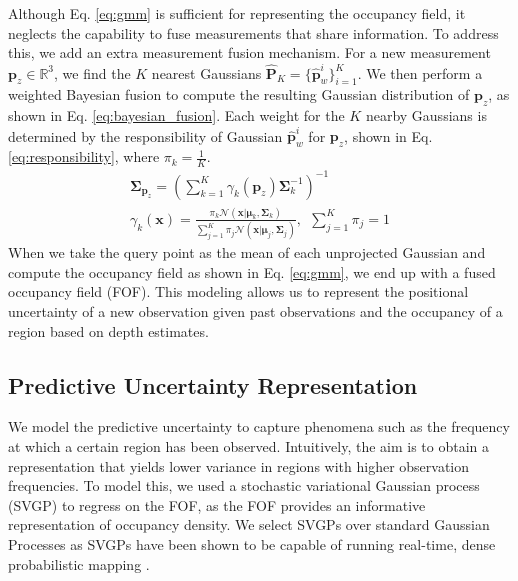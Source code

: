 Although Eq. \eqref{eq:gmm} is sufficient for representing the occupancy field, it neglects the capability to fuse measurements that share information.
To address this, we add an extra measurement fusion mechanism.
For a new measurement $\mathbf{p}_z \in \mathbb{R}^3$, we find the $K$ nearest Gaussians $\widehat{\mathbf{P}}_K = \{\widehat{\mathbf{p}}_w^i\}_{i=1}^K$. 
We then perform a weighted Bayesian fusion \cite{barfoot_state_2017} to compute the resulting Gaussian distribution of $\mathbf{p}_z$, as shown in Eq. \eqref{eq:bayesian_fusion}.
Each weight for the $K$ nearby Gaussians is determined by the responsibility of Gaussian $\widehat{\mathbf{p}}_w^i$ for $\mathbf{p}_z$, shown in Eq. \eqref{eq:responsibility}, where $\pi_k=\frac{1}{K}$.
\begin{gather}
    \mathbf{\Sigma}_{\mathbf{p}_z} = \left(\sum_{k=1}^K\gamma_k(\mathbf{p}_z)\mathbf{\Sigma}_k^{-1}\right)^{-1} \label{eq:bayesian_fusion}\\
    \gamma_k(\mathbf{x}) = \frac{\pi_k \mathcal{N}(\mathbf{x} | \boldsymbol{\mu}_k, \boldsymbol{\Sigma}_k)}{\sum_{j=1}^{K} \pi_j \mathcal{N}(\mathbf{x} | \boldsymbol{\mu}_j, \boldsymbol{\Sigma}_j)},\ \ \sum_{j=1}^K\pi_j = 1 \label{eq:responsibility}
\end{gather}
When we take the query point as the mean of each unprojected Gaussian and compute the occupancy field as shown in Eq. \eqref{eq:gmm}, we end up with a fused occupancy field (FOF).
This modeling allows us to represent the positional uncertainty of a new observation given past observations and the occupancy of a region based on depth estimates.
\subsection{Predictive Uncertainty Representation} \label{ss:pred_unc}
We model the predictive uncertainty to capture phenomena such as the frequency at which a certain region has been observed.
Intuitively, the aim is to obtain a representation that yields lower variance in regions with higher observation frequencies.
To model this, we used a stochastic variational Gaussian process (SVGP) \cite{hensman_scalable_nodate} to regress on the FOF, as the FOF provides an informative representation of occupancy density.
We select SVGPs over standard Gaussian Processes as SVGPs have been shown to be capable of running real-time, dense probabilistic mapping \cite{torroba_fully-probabilistic_2022}.

